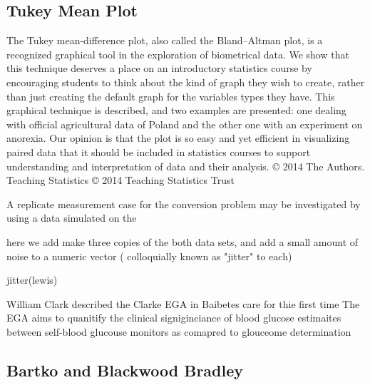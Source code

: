 \subsection*{Tukey Mean Plot}
The Tukey mean-difference plot, also called the Bland–Altman plot, is a recognized graphical tool in the exploration of biometrical data. We show that this technique deserves a place on an introductory statistics course by encouraging students to think about the kind of graph they wish to create, rather than just creating the default graph for the variables types they have. This graphical technique is described, and two examples are presented: one dealing with official agricultural data of Poland and the other one with an experiment on anorexia. Our opinion is that the plot is so easy and yet efficient in visualizing paired data that it should be included in statistics courses to support understanding and interpretation of data and their analysis. 
© 2014 The Authors. Teaching Statistics © 2014 Teaching Statistics Trust



A replicate measurement case for the conversion problem may be investigated by using a data simulated on the

here we add make three copies of the both data sets, and add a small amount of noise to a numeric vector ( colloquially known as 
"jitter" to each)

jitter(lewis)




William Clark described the Clarke EGA in Baibetes care for thie first time The EGA aims to quanitify the clinical signiginciance of blood glucose estimaites
between self-blood glucouse monitors as comapred to glouceome determination
\subsection*{Bartko and Blackwood Bradley}

